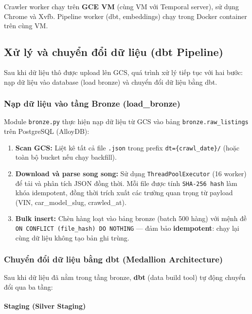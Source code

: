 Crawler worker chạy trên \textbf{GCE VM} (cùng VM với Temporal server), sử dụng Chrome và Xvfb. Pipeline worker (dbt, embeddings) chạy trong Docker container trên cùng VM.

\subsection{Xử lý và chuyển đổi dữ liệu (dbt Pipeline)}

Sau khi dữ liệu thô được upload lên GCS, quá trình xử lý tiếp tục với hai bước: nạp dữ liệu vào database (load bronze) và chuyển đổi dữ liệu bằng dbt.

\subsubsection{Nạp dữ liệu vào tầng Bronze (load\_bronze)}

Module \texttt{bronze.py} thực hiện nạp dữ liệu từ GCS vào bảng \texttt{bronze.raw\_listings} trên PostgreSQL (AlloyDB):

\begin{enumerate}
    \item \textbf{Scan GCS:} Liệt kê tất cả file \texttt{.json} trong prefix \texttt{dt=\{crawl\_date\}/} (hoặc toàn bộ bucket nếu chạy backfill).
    \item \textbf{Download và parse song song:} Sử dụng \texttt{ThreadPoolExecutor} (16 worker) để tải và phân tích JSON đồng thời. Mỗi file được tính \texttt{SHA-256 hash} làm khóa idempotent, đồng thời trích xuất các trường quan trọng từ payload (VIN, car\_model\_slug, crawled\_at).
    \item \textbf{Bulk insert:} Chèn hàng loạt vào bảng bronze (batch 500 hàng) với mệnh đề \texttt{ON CONFLICT (file\_hash) DO NOTHING} — đảm bảo \textbf{idempotent}: chạy lại cùng dữ liệu không tạo bản ghi trùng.
\end{enumerate}

\subsubsection{Chuyển đổi dữ liệu bằng dbt (Medallion Architecture)}

Sau khi dữ liệu đã nằm trong tầng bronze, \textbf{dbt} (data build tool) tự động chuyển đổi qua ba tầng:

\paragraph{Staging (Silver Staging)}


